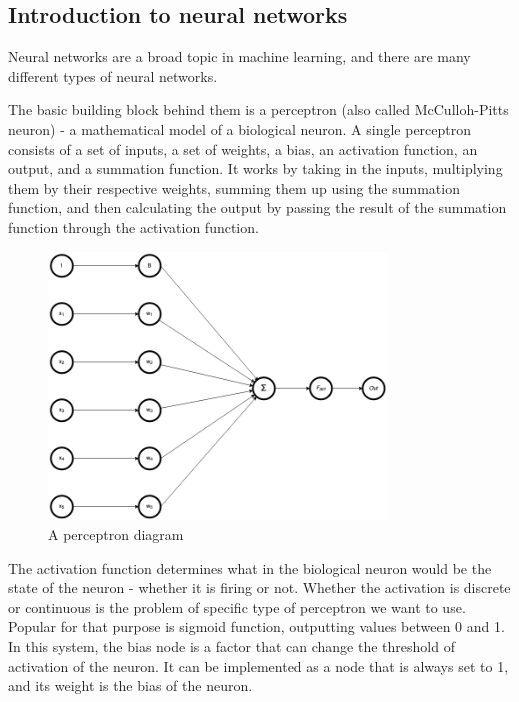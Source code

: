 \documentclass{article}
\begin{document}
\subsection{Introduction to neural networks}

Neural networks are a broad topic in machine learning, and there are many different types of neural networks.

The basic building block behind them is a 
perceptron (also called McCulloh-Pitts neuron) - a mathematical model of a biological neuron. A single perceptron consists of a set of inputs, a set of weights, a bias,
an activation function, an output, and a summation function.
It works by taking in the inputs, multiplying them by their respective weights, 
summing them up using the summation function, and then calculating the output by passing the result of the summation function through the activation function.

    \begin{figure}[h]
        \centering
        \includegraphics[width=0.8\textwidth]{perceptron.png}
        \caption{A perceptron diagram}
    \end{figure}

The activation function determines what in the biological neuron would be the state of the neuron - whether it is firing or not. Whether the activation
is discrete or continuous is the problem of specific type of perceptron we want to use. Popular for that purpose is sigmoid function, outputting values between 0 and 1.
In this system, the bias node is a factor that can change the threshold of activation of the neuron.
It can be implemented as a node that is always set to 1, and its weight is the bias of the neuron.
\end{document}
